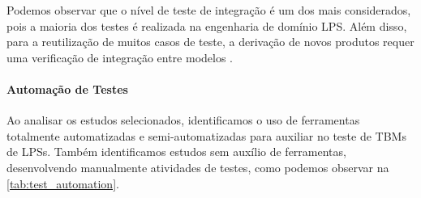 Podemos observar que o nível de teste de integração é um dos mais considerados, pois a maioria dos testes é realizada na engenharia de domínio LPS. Além disso, para a reutilização de muitos casos de teste, a derivação de novos produtos requer uma verificação de integração entre modelos \cite{samih2014mplm, oster2011pairwise, samih2014deriving, oster2012feature, olimpiew2008model, cichos2011model, devroey2014coverage, varshosaz2015delta, samih2012relating, dukaczewski2013requirements, Garcia_et_al2010, wang2013automated, devroey2014behavioural, cai2013model} .



\paragraph{\textbf{Automação de Testes}}

Ao analisar os estudos selecionados, identificamos o uso de ferramentas totalmente automatizadas e semi-automatizadas para auxiliar no teste de TBMs de LPSs. Também identificamos estudos sem auxílio de ferramentas, desenvolvendo manualmente atividades de testes, como podemos observar na \ref{tab:test_automation}.

